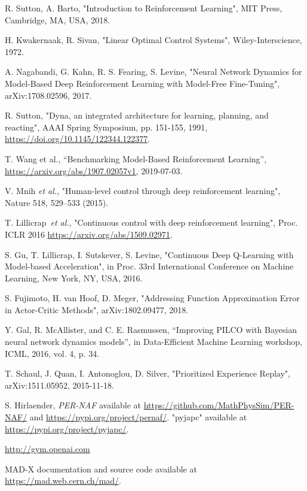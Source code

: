 \documentclass[
 reprint,
 amsmath,amssymb,amsfonts,clevref,
 aps,
prstab,
]{revtex4-2}
\begin{document}
\begin{thebibliography}{9}
 R. Sutton, A. Barto, "Introduction to Reinforcement Learning",  MIT Press, Cambridge, MA, USA, 2018.

 H. Kwakernaak, R. Sivan, "Linear Optimal Control Systems", Wiley-Interscience, 1972.

 A. Nagabandi, G. Kahn, R. S. Fearing, S. Levine, "Neural Network Dynamics for Model-Based Deep Reinforcement Learning with Model-Free Fine-Tuning", arXiv:1708.02596, 2017. 

 R. Sutton, "Dyna, an integrated architecture for learning, planning, and reacting", AAAI Spring Symposium, pp. 151-155, 1991, \url{https://doi.org/10.1145/122344.122377}.

 T. Wang et al., “Benchmarking Model-Based Reinforcement Learning”,  \url{https://arxiv.org/abs/1907.02057v1}, 2019-07-03.

 V. Mnih \textit{et al.}, "Human-level control through deep reinforcement learning", Nature 518, 529–533 (2015).

 T. Lillicrap~\textit{et al.}, "Continuous control with deep reinforcement learning", Proc. ICLR 2016 \url{https://arxiv.org/abs/1509.02971}.

 S. Gu, T. Lillicrap, I. Sutskever, S. Levine, "Continuous Deep Q-Learning with Model-based Acceleration", in Proc. 33rd International Conference on Machine Learning, New York, NY, USA, 2016.

 S. Fujimoto, H. van Hoof, D. Meger, "Addressing Function Approximation Error in Actor-Critic Methods", arXiv:1802.09477, 2018.

 Y. Gal, R. McAllister, and C. E. Rasmussen, “Improving PILCO with Bayesian neural network dynamics models”, in Data-Efficient Machine Learning workshop, ICML, 2016, vol. 4, p. 34.

 T. Schaul, J. Quan, I. Antonoglou, D. Silver, "Prioritized Experience Replay", arXiv:1511.05952, 2015-11-18.

 S. Hirlaender, \textit{PER-NAF} available at \url{https://github.com/MathPhysSim/PER-NAF/} and
\url{https://pypi.org/project/pernaf/}.
 "pyjapc" available at \url{https://pypi.org/project/pyjapc/}.

 \url{http://gym.openai.com}

 MAD-X documentation and source code available at \url{https://mad.web.cern.ch/mad/}.


\end{thebibliography}
\end{document}
